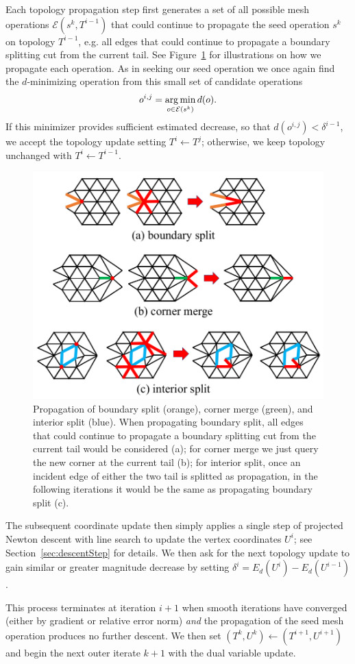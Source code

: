 Each topology propagation step first generates a set of all possible mesh operations $\mathcal{E}(s^k, T^{i-1})$ that could continue to propagate the seed operation $s^k$ on topology $T^{i-1}$, e.g. all edges that could continue to propagate a boundary splitting cut from the current tail. See Figure\ \ref{fig:propagation} for illustrations on how we propagate each operation.
As in seeking our seed operation we once again find the $d$-minimizing operation from this small set of candidate operations
\begin{align}
\label{eq:minE}
o^{i,j} = \operatorname*{arg\,min}_{o \in \mathcal{E}(s^k)} d(o).
\end{align}
If this minimizer provides sufficient estimated decrease, so that $d(o^{i,j}) < \delta^{i-1}$, we accept the topology update setting $T^i \leftarrow T^j$; otherwise, we keep topology unchanged with $T^i \leftarrow T^{i-1}.$

\begin{figure}[t]
\centering
\includegraphics[width=0.8\linewidth]{fig/propagation.png}
\caption{Propagation of boundary split (orange), corner merge (green), and interior split (blue). When propagating boundary split, all edges that could continue to propagate a boundary splitting cut from the current tail would be considered (a); for corner merge we just query the new corner at the current tail (b); for interior split, once an incident edge of either the two tail is splitted as propagation, in the following iterations it would be the same as propagating boundary split (c).}
\label{fig:propagation}
\end{figure}

The subsequent coordinate update then simply applies a single step of projected Newton descent with line search to update the vertex coordinates $U^i$; see Section~\ref{sec:descentStep} for details. We then ask for the next topology update to gain similar or greater magnitude decrease by setting $\delta^i = E_d(U^i) - E_d(U^{i-1})$.

This process terminates at iteration $i+1$ when smooth iterations have converged (either by gradient or relative error norm) \emph{and} the propagation of the seed mesh operation produces no further descent. We then set $(T^k,U^k) \leftarrow (T^{i+1},U^{i+1})$ and begin the next outer iterate $k+1$ with the dual variable update. 


